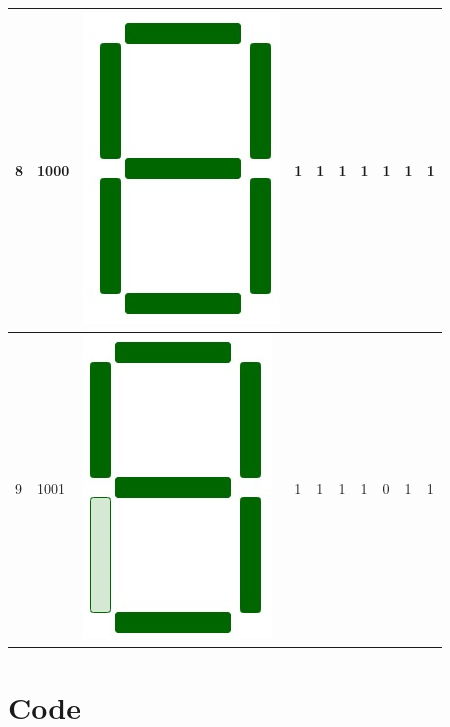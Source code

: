 \documentclass[12pt,singleside,a4paper]{article}
\begin{document}
\begin{center}
\begin{tabular}{ |p{1cm}|p{1cm}|p{1.5cm}|p{1cm}|p{1cm}|p{1cm}|p{1cm}|p{1cm}|p{1cm}|p{1cm}|}
    8   &   1000    &     \includegraphics[scale=0.1]{Display/8.png}       &   1   &   1   &   1   &   1   &   1   &   1   &   1   \\\hline
    9   &   1001    &     \includegraphics[scale=0.1]{Display/9.png}       &   1   &   1   &   1   &   1   &   0   &   1   &   1   \\\hline
    



\end{tabular} 
\end{center}



\newpage
\section{Code}
\end{document}
